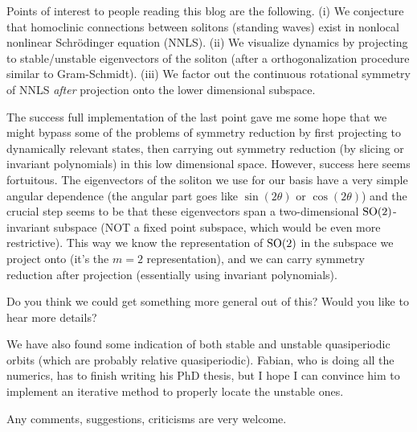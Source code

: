 \begin{description}
Points of interest to people
reading this blog are the following. (i) We conjecture that homoclinic connections
between solitons
(standing waves) exist in nonlocal nonlinear Schr\"odinger equation (NNLS).
(ii) We visualize dynamics by projecting to stable/unstable eigenvectors of
the soliton (after a orthogonalization procedure similar to Gram-Schmidt).
(iii) We factor out the continuous rotational symmetry of NNLS
\emph{after} projection onto the lower dimensional subspace.

The success full implementation of the last point
gave me some hope that we might bypass some of the problems
of symmetry reduction by
first projecting to dynamically relevant states, then carrying out symmetry reduction
(by slicing or invariant polynomials) in this low dimensional space. However,
success here seems fortuitous. The eigenvectors of the soliton we use
for our basis have a
very simple angular dependence (the angular part goes like
$\sin (2\theta)$ or $\cos (2\theta)$) and the crucial step seems to be that
these eigenvectors span
a two-dimensional $\textrm{SO}(2)$-invariant subspace (NOT a fixed point subspace,
which would be even more restrictive). This way we know the representation of
$\textrm{SO}(2)$ in the subspace we project onto (it's the $m=2$ representation),
and we can carry symmetry reduction
after projection (essentially using invariant polynomials).

Do you think we could get something more general out of this? Would you like to
hear more details?

We have also found some indication of both stable and unstable quasiperiodic
orbits (which are probably relative quasiperiodic). Fabian, who is doing all the
numerics, has to finish writing his PhD thesis, but I hope I can convince him to
implement an iterative method to properly locate the unstable ones.

Any comments, suggestions, criticisms are very welcome.

\end{description}



\renewcommand{\ssp}{a}
